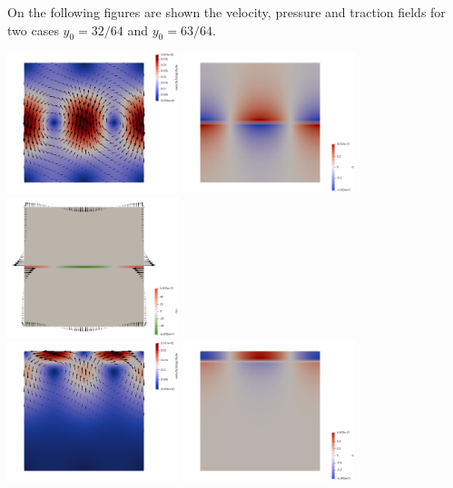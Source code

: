 On the following figures are shown the velocity, pressure and traction fields for two cases $y_0=32/64$ and $y_0=63/64$.
\begin{center}
\includegraphics[width=5cm]{python_codes/fieldstone_27/results/32_64/vel}
\includegraphics[width=5cm]{python_codes/fieldstone_27/results/32_64/p}
\includegraphics[width=5cm]{python_codes/fieldstone_27/results/32_64/tractions}\\
\includegraphics[width=5cm]{python_codes/fieldstone_27/results/59_64/vel}
\includegraphics[width=5cm]{python_codes/fieldstone_27/results/59_64/p}

\end{center}
